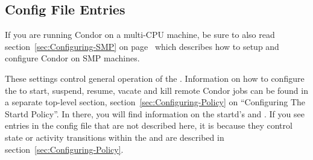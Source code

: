 \subsection{\label{sec:Startd-Config-File-Entries}
 Config File Entries}

\Note If you are running Condor on a multi-CPU machine, be sure
to also read section~\ref{sec:Configuring-SMP} on
page~\pageref{sec:Configuring-SMP} which describes how to setup and
configure Condor on SMP machines.

These settings control general operation of the .
Information on how to configure the  to start, suspend,
resume, vacate and kill remote Condor jobs can be found in a separate
top-level section, section~\ref{sec:Configuring-Policy} on
``Configuring The Startd Policy''.  In there, you will find
information on the startd's  and .  If
you see entries in the config file that are not described here, it is
because they control state or activity transitions within the
 and are described in
section~\ref{sec:Configuring-Policy}.
